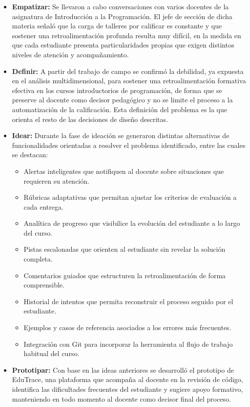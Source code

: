 \documentclass[letterpaper, 10 pt, conference]{ieeeconf}
\begin{document}
\begin{itemize}
	\item \textbf{Empatizar:} Se llevaron a cabo conversaciones con varios docentes de la asignatura de Introducción a la Programación. El jefe de sección de dicha materia señaló que la carga de talleres por calificar es constante y que sostener una retroalimentación profunda resulta muy difícil, en la medida en que cada estudiante presenta particularidades propias que exigen distintos niveles de atención y acompañamiento.
	\item \textbf{Definir:} A partir del trabajo de campo se confirmó la debilidad, ya expuesta en el análisis multidimensional, para sostener una retroalimentación formativa efectiva en los cursos introductorios de programación, de forma que se preserve al docente como decisor pedagógico y no se limite el proceso a la automatización de la calificación. Esta definición del problema es la que orienta el resto de las decisiones de diseño descritas.
	\item \textbf{Idear:} Durante la fase de ideación se generaron distintas alternativas de funcionalidades orientadas a resolver el problema identificado, entre las cuales se destacan:
	\begin{itemize}
		\item Alertas inteligentes que notifiquen al docente sobre situaciones que requieren su atención.
		\item Rúbricas adaptativas que permitan ajustar los criterios de evaluación a cada entrega.
		\item Analítica de progreso que visibilice la evolución del estudiante a lo largo del curso.
		\item Pistas escalonadas que orienten al estudiante sin revelar la solución completa.
		\item Comentarios guiados que estructuren la retroalimentación de forma comprensible.
		\item Historial de intentos que permita reconstruir el proceso seguido por el estudiante.
		\item Ejemplos y casos de referencia asociados a los errores más frecuentes.
		\item Integración con Git para incorporar la herramienta al flujo de trabajo habitual del curso.
	\end{itemize}
	\item \textbf{Prototipar:} Con base en las ideas anteriores se desarrolló el prototipo de EduTrace, una plataforma que acompaña al docente en la revisión de código, identifica las dificultades frecuentes del estudiante y sugiere apoyo formativo, manteniendo en todo momento al docente como decisor final del proceso.

\end{itemize}
\end{document}
